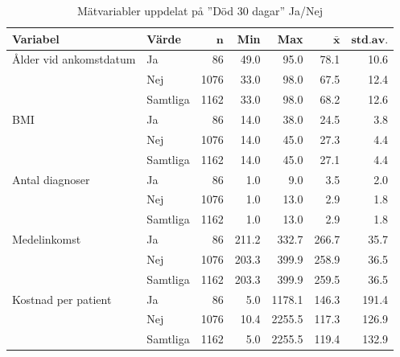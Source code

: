 \begin{table}[htbp]
\centering
\caption{Mätvariabler uppdelat på ''Död 30 dagar'' Ja/Nej}
\label{tab:dl1}
{\footnotesize
\begin{tabular}{llrrrrr}
 \textbf{Variabel} & \textbf{Värde} & $\mathbf{n}$ & \textbf{Min} & \textbf{Max} & $\mathbf{\bar{x}}$ & $\mathbf{std.av.}$ \\ 
  \hline
Ålder vid ankomstdatum & Ja &   86 &  49.0 &   95.0 &  78.1 &  10.6 \\ 
   & Nej & 1076 &  33.0 &   98.0 &  67.5 &  12.4 \\ 
   \hline
 & Samtliga & 1162 &  33.0 &   98.0 &  68.2 &  12.6 \\ 
   \hline
BMI & Ja &   86 &  14.0 &   38.0 &  24.5 &   3.8 \\ 
   & Nej & 1076 &  14.0 &   45.0 &  27.3 &   4.4 \\ 
   \hline
 & Samtliga & 1162 &  14.0 &   45.0 &  27.1 &   4.4 \\ 
   \hline
Antal diagnoser & Ja &   86 &   1.0 &    9.0 &   3.5 &   2.0 \\ 
   & Nej & 1076 &   1.0 &   13.0 &   2.9 &   1.8 \\ 
   \hline
 & Samtliga & 1162 &   1.0 &   13.0 &   2.9 &   1.8 \\ 
   \hline
Medelinkomst & Ja &   86 & 211.2 &  332.7 & 266.7 &  35.7 \\ 
   & Nej & 1076 & 203.3 &  399.9 & 258.9 &  36.5 \\ 
   \hline
 & Samtliga & 1162 & 203.3 &  399.9 & 259.5 &  36.5 \\ 
   \hline
Kostnad per patient & Ja &   86 &   5.0 & 1178.1 & 146.3 & 191.4 \\ 
   & Nej & 1076 &  10.4 & 2255.5 & 117.3 & 126.9 \\ 
   \hline
 & Samtliga & 1162 &   5.0 & 2255.5 & 119.4 & 132.9 \\ 
   \hline
\end{tabular}
}
\end{table}


